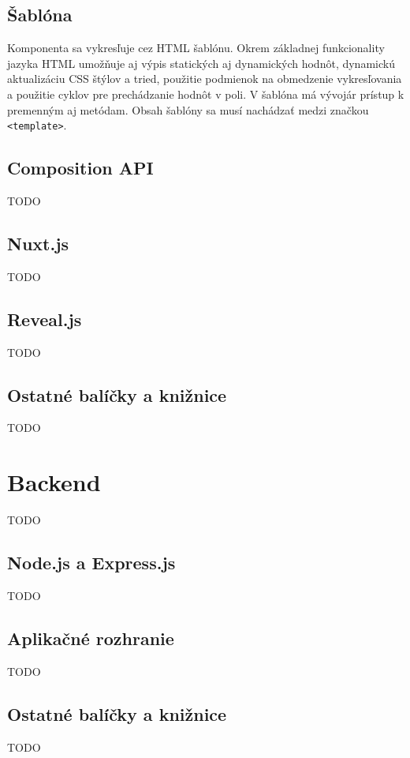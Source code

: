\subsection*{Šablóna}
Komponenta sa vykresľuje cez HTML šablónu. Okrem základnej funkcionality jazyka HTML umožňuje aj výpis statických aj dynamických hodnôt, dynamickú aktualizáciu CSS štýlov a tried, použitie podmienok na obmedzenie vykresľovania a použitie cyklov pre prechádzanie hodnôt v poli. V šablóna má vývojár prístup k premenným aj metódam. Obsah šablóny sa musí nachádzať medzi značkou \texttt{<template>}.

\subsection{Composition API}
\label{compositionapi}
TODO

\subsection{Nuxt.js}
TODO

\subsection{Reveal.js}
TODO

\subsection{Ostatné balíčky a knižnice}
TODO

\section{Backend}
TODO

\subsection{Node.js a Express.js}
\label{node}
TODO

\subsection{Aplikačné rozhranie}
TODO

\subsection{Ostatné balíčky a knižnice}
TODO